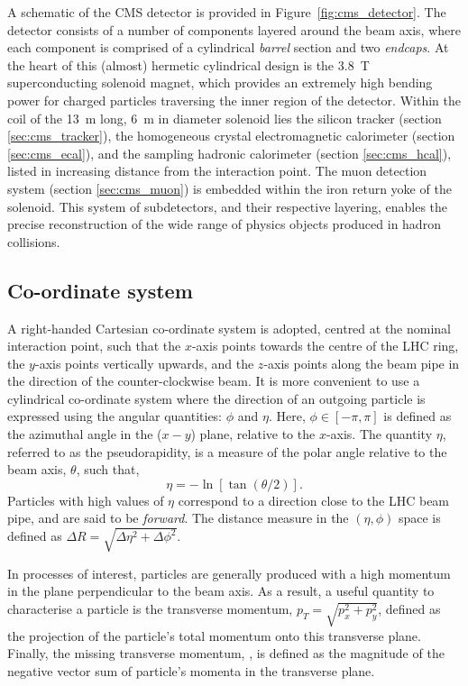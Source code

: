 A schematic of the CMS detector is provided in Figure~\ref{fig:cms_detector}. The detector consists of a number of components layered around the beam axis, where each component is comprised of a cylindrical \textit{barrel} section and two \textit{endcaps}. At the heart of this (almost) hermetic cylindrical design is the 3.8~T superconducting solenoid magnet, which provides an extremely high bending power for charged particles traversing the inner region of the detector. Within the coil of the 13~m long, 6~m in diameter solenoid lies the silicon tracker (section \ref{sec:cms_tracker}), the homogeneous crystal electromagnetic calorimeter (section \ref{sec:cms_ecal}), and the sampling hadronic calorimeter (section \ref{sec:cms_hcal}), listed in increasing distance from the interaction point. The muon detection system (section \ref{sec:cms_muon}) is embedded within the iron return yoke of the solenoid. This system of subdetectors, and their respective layering, enables the precise reconstruction of the wide range of physics objects produced in hadron collisions.

\subsection{Co-ordinate system}
A right-handed Cartesian co-ordinate system is adopted, centred at the nominal interaction point, such that the $x$-axis points towards the centre of the LHC ring, the $y$-axis points vertically upwards, and the $z$-axis points along the beam pipe in the direction of the counter-clockwise beam. It is more convenient to use a cylindrical co-ordinate system where the direction of an outgoing particle is expressed using the angular quantities: $\phi$ and $\eta$. Here, $\phi \in [-\pi,\pi]$ is defined as the azimuthal angle in the ($x-y$) plane, relative to the $x$-axis. The quantity $\eta$, referred to as the pseudorapidity, is a measure of the polar angle relative to the beam axis, $\theta$, such that,
\begin{equation}
    \eta = - \ln[\tan(\theta/2)].
\end{equation}
Particles with high values of $\eta$ correspond to a direction close to the LHC beam pipe, and are said to be \textit{forward}. The distance measure in the $(\eta,\phi)$ space is defined as $\Delta R = \sqrt{\Delta\eta^2+\Delta\phi^2}$. 

In processes of interest, particles are generally produced with a high momentum in the plane perpendicular to the beam axis. As a result, a useful quantity to characterise a particle is the transverse momentum, $p_T = \sqrt{p_x^2+p_y^2}$, defined as the projection of the particle's total momentum onto this transverse plane. Finally, the missing transverse momentum, \met, is defined as the magnitude of the negative vector sum of particle's momenta in the transverse plane.

